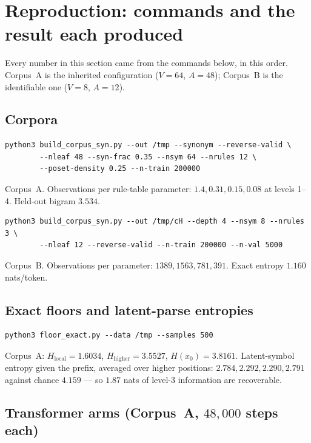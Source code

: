 \documentclass[11pt,a4paper]{article}
\theoremstyle{plain}
\theoremstyle{definition}
\begin{document}
\section{Reproduction: commands and the result each produced}
\label{sec:hier-repro}

Every number in this section came from the commands below, in this order.
Corpus~A is the inherited configuration ($V=64$, $A=48$); Corpus~B is the
identifiable one ($V=8$, $A=12$).

\subsection*{Corpora}

\begin{verbatim}
python3 build_corpus_syn.py --out /tmp --synonym --reverse-valid \
        --nleaf 48 --syn-frac 0.35 --nsym 64 --nrules 12 \
        --poset-density 0.25 --n-train 200000
\end{verbatim}
Corpus~A. Observations per rule-table parameter: $1.4, 0.31, 0.15, 0.08$ at
levels 1--4. Held-out bigram $3.534$.

\begin{verbatim}
python3 build_corpus_syn.py --out /tmp/cH --depth 4 --nsym 8 --nrules 3 \
        --nleaf 12 --reverse-valid --n-train 200000 --n-val 5000
\end{verbatim}
Corpus~B. Observations per parameter: $1389, 1563, 781, 391$. Exact entropy
$1.160$ nats/token.

\subsection*{Exact floors and latent-parse entropies}

\begin{verbatim}
python3 floor_exact.py --data /tmp --samples 500
\end{verbatim}
Corpus~A: $H_{\mathrm{local}}=1.6034$, $H_{\mathrm{higher}}=3.5527$,
$H(x_0)=3.8161$. Latent-symbol entropy given the prefix, averaged over higher
positions: $2.784, 2.292, 2.290, 2.791$ against chance $4.159$ --- so $1.87$
nats of level-3 information are recoverable.

\subsection*{Transformer arms (Corpus~A, $48{,}000$ steps each)}
\end{document}
